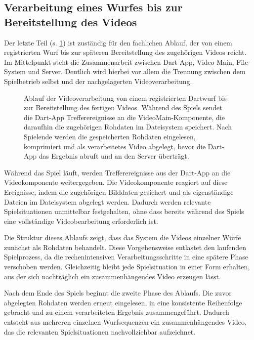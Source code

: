 \subsection{Verarbeitung eines Wurfes bis zur Bereitstellung des Videos}

Der letzte Teil (s. \cref{fig:dartsequenz3}) ist zuständig für den fachlichen Ablauf, der von einem registrierten Wurf bis zur späteren Bereitstellung des zugehörigen Videos reicht. Im Mittelpunkt steht die Zusammenarbeit zwischen Dart-App, Video-Main, File-System und Server. 
Deutlich wird hierbei vor allem die Trennung zwischen dem Spielbetrieb selbst und der nachgelagerten Videoverarbeitung.

\begin{figure}[h!]
    \centering
    {\scriptsize
    }
    \caption[Verarbeitung eines Dartwurfs bis zum Video-Upload]{Ablauf der Videoverarbeitung von einem registrierten Dartwurf bis zur Bereitstellung des fertigen Videos. Während des Spiels sendet die Dart-App Trefferereignisse an die VideoMain-Komponente, die daraufhin die zugehörigen Rohdaten im Dateisystem speichert. 
    Nach Spielende werden die gespeicherten Rohdaten eingelesen, komprimiert und als verarbeitetes Video abgelegt, bevor die Dart-App das Ergebnis abruft und an den Server überträgt.}
    \label{fig:dartsequenz3}
\end{figure}

Während das Spiel läuft, werden Trefferereignisse aus der Dart-App an die Videokomponente weitergegeben. Die Videokomponente reagiert auf diese Ereignisse, indem die zugehörigen Bilddaten gesichert und als eigenständige Dateien im Dateisystem abgelegt werden. 
Dadurch werden relevante Spielsituationen unmittelbar festgehalten, ohne dass bereits während des Spiels eine vollständige Videobearbeitung erforderlich ist.

Die Struktur dieses Ablaufs zeigt, dass das System die Videos einzelner Würfe zunächst als Rohdaten behandelt. Diese Vorgehensweise entlastet den laufenden Spielprozess, da die rechenintensiven Verarbeitungsschritte in eine spätere Phase verschoben werden. Gleichzeitig bleibt jede Spielsituation in einer Form erhalten, 
aus der sich nachträglich ein zusammenhängendes Video erzeugen lässt.

Nach dem Ende des Spiels beginnt die zweite Phase des Ablaufs. Die zuvor abgelegten Rohdaten werden erneut eingelesen, in eine konsistente Reihenfolge gebracht und zu einem verarbeiteten Ergebnis zusammengeführt. Dadurch entsteht aus mehreren einzelnen Wurfsequenzen ein zusammenhängendes Video,
das die relevanten Spielsituationen nachvollziehbar aufzeichnet.

